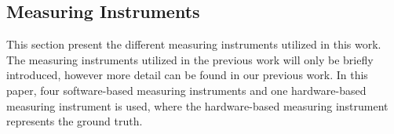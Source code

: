 \subsection{Measuring Instruments}
This section present the different measuring instruments utilized in this work. The measuring instruments utilized in the previous work will only be briefly introduced, however more detail can be found in our previous work\cite{biksbois}. In this paper, four software-based measuring instruments and one hardware-based measuring instrument is used, where the hardware-based measuring instrument represents the ground truth.




